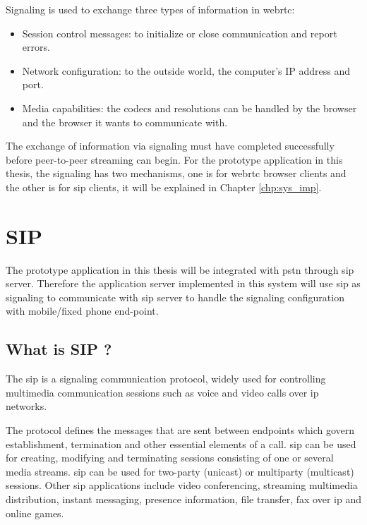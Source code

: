 \noindent Signaling is used to exchange three types of information in \gls{webrtc}\cite{html5rock:webrtc}:

\begin{itemize}[topsep=-1em,parsep=0em,itemsep=0em]
 \item Session control messages: to initialize or close communication and report errors.
 \item Network configuration: to the outside world, the computer's IP address and port.
 \item Media capabilities: the codecs and resolutions can be handled by the browser and the browser it wants to communicate with.
\end{itemize}

\par The exchange of information via signaling must have completed successfully before peer-to-peer streaming can begin. For the prototype application in this thesis, the signaling has two mechanisms, one is for \gls{webrtc} browser clients and the other is for \gls{sip} clients, it will be explained in Chapter \ref{chp:sys_imp}.

\section{SIP}
\noindent The prototype application in this thesis will be integrated with \gls{pstn} through \gls{sip} server. Therefore the application server implemented in this system will use \gls{sip} as signaling to communicate with \gls{sip} server to handle the signaling configuration with mobile/fixed phone end-point.

\subsection{What is SIP ?}
\noindent The \gls{sip} is a signaling communication protocol, widely used for controlling multimedia communication sessions such as voice and video calls over \gls{ip} networks.

\par The protocol defines the messages that are sent between endpoints which govern establishment, termination and other essential elements of a call. \gls{sip} can be used for creating, modifying and terminating sessions consisting of one or several media streams. \gls{sip} can be used for two-party (unicast) or multiparty (multicast) sessions. Other \gls{sip} applications include video conferencing, streaming multimedia distribution, instant messaging, presence information, file transfer, fax over \gls{ip} and online games.\cite{wiki:sip}

